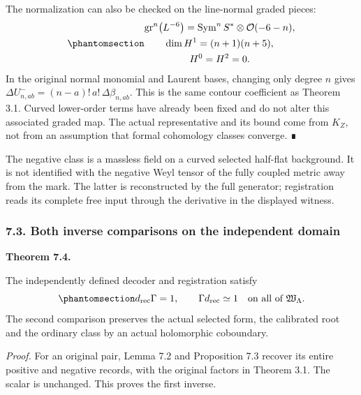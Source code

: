 \documentclass[
  english,
  11pt,
  reqno]{amsart}
\makeatletter
\newcommand{\pandocstatementheading}[1]{%
  \par\addpenalty{\@beginparpenalty}%
  \addvspace{.5\baselineskip plus .2\baselineskip minus .2\baselineskip}%
  {\normalfont\bfseries #1\par}%
  \nobreak\@afterindenttrue\@afterheading
}
\makeatother
\begin{document}
The normalization can also be checked on the line-normal graded pieces:
\begin{equation}\protect\phantomsection\label{eq:gg-negative-ordinary-graded-piece}{\begin{gathered}
\operatorname{gr}^n\!\left(L^{-6}\right)
   =\operatorname{Sym}^nS^*\otimes\mathcal O(-6-n), \\
\dim H^1=(n+1)(n+5), \\
H^0=H^2=0.
\end{gathered}}\end{equation} In the original normal monomial and Laurent bases,
changing only degree \(n\) gives
\(\Delta U^-_{n,ab}=(n-a)!\,a!\,\Delta\beta_{n,ab}\). This is the same
contour coefficient as Theorem 3.1. Curved lower-order terms have
already been fixed and do not alter this associated graded map. The
actual representative and its bound come from \(K_Z\), not from an
assumption that formal cohomology classes converge. ∎

The negative class is a massless field on a curved selected half-flat
background. It is not identified with the negative Weyl tensor of the
fully coupled metric away from the mark. The latter is reconstructed by
the full generator; registration reads its complete free input through
the derivative in the displayed witness.

\protect{}\label{sec:gg-ordinary-both-counits}

\subsubsection{7.3. Both inverse comparisons on the independent
domain}\label{both-inverse-comparisons-on-the-independent-domain}

\pandocstatementheading{\protect{}\label{thm:gg-independent-ordinary-inverses}Theorem 7.4.}

The independently defined decoder and registration satisfy
\begin{equation}\protect\phantomsection\label{eq:gg-independent-ordinary-counits}{
 d_{\mathrm{rec}}\Gamma=1,\qquad
 \Gamma d_{\mathrm{rec}}\simeq1
       \quad\text{on all of }\mathfrak W_\Lambda .
}\end{equation} The second comparison preserves the actual selected
form, the calibrated root and the ordinary class by an actual
holomorphic coboundary.

\emph{Proof.} For an original pair, Lemma 7.2 and Proposition 7.3
recover its entire positive and negative records, with the original
factors in Theorem 3.1. The scalar is unchanged. This proves the first
inverse.
\end{document}
